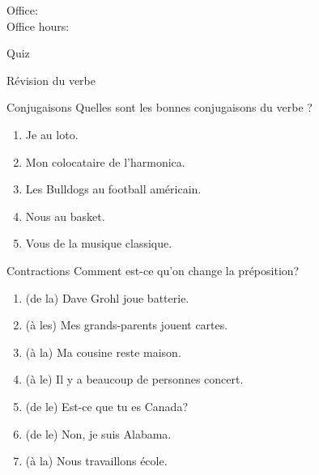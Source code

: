 \documentclass{beamer}
\subtitle[Loisirs (jouer) et prépositions]{Les loisirs que nous jouons et \lexi{à} et \lexi{de}}
\begin{document}
  \begin{frame}
    \titlepage
    \tiny{Office: \\
          Office hours: }
  \end{frame}

  \begin{frame}{}
    \begin{center}
      \Large Quiz
    \end{center}
  \end{frame}

  \begin{frame}{Révision du verbe }
    \begin{center}
      
    \end{center}
  \end{frame}
  
  \begin{frame}{Conjugaisons }
    Quelles sont les bonnes conjugaisons du verbe ? \\
    \begin{enumerate}
      \item Je \underline{} au loto.
      \item Mon colocataire \underline{} de l'harmonica.
      \item Les Bulldogs \underline{} au football américain.
      \item Nous \underline{} au basket.
      \item Vous \underline{} de la musique classique.
    \end{enumerate}
  \end{frame}

  \begin{frame}{Contractions }
    Comment est-ce qu'on change la préposition? \\
    \begin{enumerate}
      \item (de la) Dave Grohl joue \underline{} batterie.
      \item (à les) Mes grands-parents jouent \underline{} cartes.
      \item (à la) Ma cousine reste \underline{} maison.
      \item (à le) Il y a beaucoup de personnes \underline{} concert.
      \item (de le) Est-ce que tu es \underline{} Canada?
      \item (de le) Non, je suis \underline{} Alabama.
      \item (à la) Nous travaillons \underline{} école.
    \end{enumerate}
  \end{frame}
\end{document}
